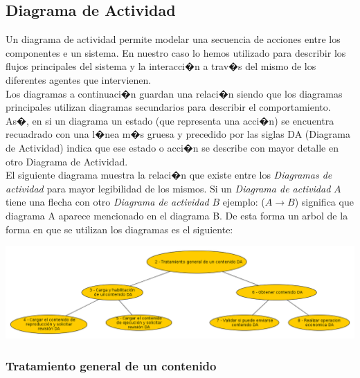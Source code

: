 \documentclass[11pt, a4paper, spanish]{article}
\begin{document}
{\newpage

\subsection{Diagrama de Actividad}

	Un diagrama de actividad permite modelar una secuencia de acciones entre los componentes e un sistema. En nuestro caso lo hemos utilizado para 
describir los flujos principales del sistema y la interacci�n a trav�s del mismo de los diferentes agentes que intervienen.\\

	Los diagramas a continuaci�n guardan una relaci�n siendo que los diagramas principales utilizan diagramas secundarios para describir el comportamiento. As�, en si un diagrama un estado (que representa una acci�n) se encuentra recuadrado con una l�nea m�s gruesa y precedido por las siglas DA (Diagrama de Actividad) indica que ese estado o acci�n se describe con mayor detalle en otro Diagrama de Actividad.\\

	El siguiente diagrama muestra la relaci�n que existe entre los \emph{Diagramas de actividad} para mayor legibilidad de los mismos. Si un \emph{Diagrama de actividad} $A$ tiene una flecha con otro \emph{Diagrama de actividad} $B$ ejemplo: ($A \rightarrow B$) significa que diagrama A aparece mencionado en el diagrama B.
De esta forma un arbol de la forma en que se utilizan los diagramas es el siguiente:\\


	\begin{center}
		\includegraphics[scale=0.37]{Diagramas/00-DiagramaDeDiagramas.png}
	\end{center}

\subsubsection{Tratamiento general de un contenido}

}
\end{document}
